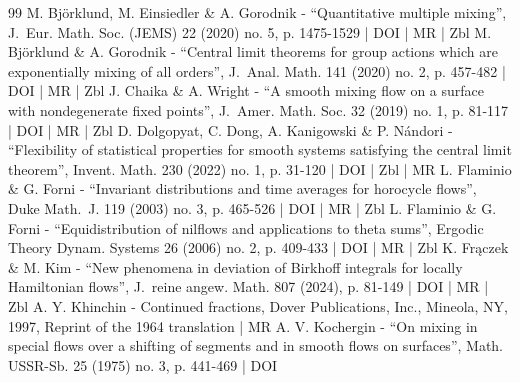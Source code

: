 \begin{thebibliography}{99}
M. Björklund, M. Einsiedler \& A. Gorodnik - “Quantitative multiple mixing”, J. Eur. Math. Soc. (JEMS) 22 (2020) no. 5, p. 1475-1529 | DOI | MR | Zbl
M. Björklund \& A. Gorodnik - “Central limit theorems for group actions which are exponentially mixing of all orders”, J. Anal. Math. 141 (2020) no. 2, p. 457-482 | DOI | MR | Zbl
J. Chaika \& A. Wright - “A smooth mixing flow on a surface with nondegenerate fixed points”, J. Amer. Math. Soc. 32 (2019) no. 1, p. 81-117 | DOI | MR | Zbl
D. Dolgopyat, C. Dong, A. Kanigowski \& P. Nándori - “Flexibility of statistical properties for smooth systems satisfying the central limit theorem”, Invent. Math. 230 (2022) no. 1, p. 31-120 | DOI | Zbl | MR
L. Flaminio \& G. Forni - “Invariant distributions and time averages for horocycle flows”, Duke Math. J. 119 (2003) no. 3, p. 465-526 | DOI | MR | Zbl
L. Flaminio \& G. Forni - “Equidistribution of nilflows and applications to theta sums”, Ergodic Theory Dynam. Systems 26 (2006) no. 2, p. 409-433 | DOI | MR | Zbl
K. Frączek \& M. Kim - “New phenomena in deviation of Birkhoff integrals for locally Hamiltonian flows”, J. reine angew. Math. 807 (2024), p. 81-149 | DOI | MR | Zbl
A. Y. Khinchin - Continued fractions, Dover Publications, Inc., Mineola, NY, 1997, Reprint of the 1964 translation | MR
A. V. Kochergin - “On mixing in special flows over a shifting of segments and in smooth flows on surfaces”, Math. USSR-Sb. 25 (1975) no. 3, p. 441-469 | DOI
\end{thebibliography}
